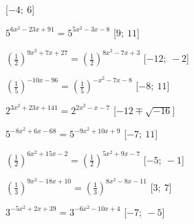 \begin{esercizio}
\begin{enumeratea}
   \hfill [\(-4;~6\)]
  \item  \(5^{6 x^2 -23 x +91} = 5^{5 x^2 -3 x -8}\)
   \hfill [\(9;~11\)]
  \item  \(\left(\frac{1}{2}\right)^{9 x^2 +7 x +27} = 
\left(\frac{1}{2}\right)^{8 x^2 -7 x +3}\)
   \hfill [\(-12;~-2\)]
  \item  \(\left(\frac{1}{5}\right)^{-10 x -96} = \left(\frac{1}{5}\right)^{- 
x^2 -7 x -8}\)
   \hfill [\(-8;~11\)]
  \item  \(2^{3 x^2 +23 x +141} = 2^{2 x^2 - x -7}\)
   \hfill [\(-12 \mp \sqrt{-16}\)]
  \item  \(5^{-8 x^2 +6 x -68} = 5^{-9 x^2 +10 x +9}\)
   \hfill [\(-7;~11\)]
  \item  \(\left(\frac{1}{2}\right)^{6 x^2 +15 x -2} = 
\left(\frac{1}{2}\right)^{5 x^2 +9 x -7}\)
   \hfill [\(-5;~-1\)]
  \item  \(\left(\frac{1}{3}\right)^{9 x^2 -18 x +10} = 
\left(\frac{1}{3}\right)^{8 x^2 -8 x -11}\)
   \hfill [\(3;~7\)]
  \item  \(3^{-5 x^2 +2 x +39} = 3^{-6 x^2 -10 x +4}\)
   \hfill [\(-7;~-5\)]
 \end{enumeratea}
\end{esercizio}


